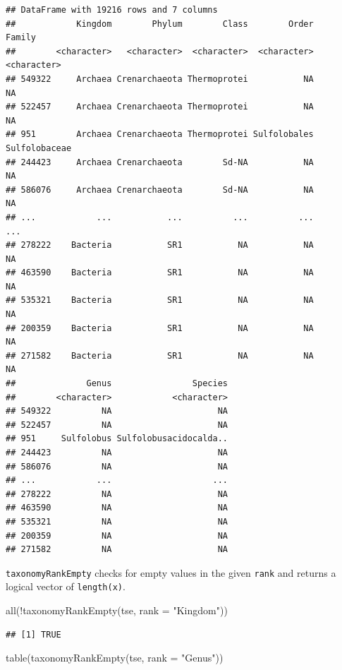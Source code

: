\documentclass[
]{book}
\newenvironment{Shaded}{\begin{snugshade}}{\end{snugshade}}
\newcommand{\AttributeTok}[1]{\textcolor[rgb]{0.77,0.63,0.00}{#1}}
\newcommand{\FunctionTok}[1]{\textcolor[rgb]{0.00,0.00,0.00}{#1}}
\newcommand{\NormalTok}[1]{#1}
\newcommand{\SpecialCharTok}[1]{\textcolor[rgb]{0.00,0.00,0.00}{#1}}
\newcommand{\StringTok}[1]{\textcolor[rgb]{0.31,0.60,0.02}{#1}}
\begin{document}
\begin{verbatim}
## DataFrame with 19216 rows and 7 columns
##            Kingdom        Phylum        Class        Order        Family
##        <character>   <character>  <character>  <character>   <character>
## 549322     Archaea Crenarchaeota Thermoprotei           NA            NA
## 522457     Archaea Crenarchaeota Thermoprotei           NA            NA
## 951        Archaea Crenarchaeota Thermoprotei Sulfolobales Sulfolobaceae
## 244423     Archaea Crenarchaeota        Sd-NA           NA            NA
## 586076     Archaea Crenarchaeota        Sd-NA           NA            NA
## ...            ...           ...          ...          ...           ...
## 278222    Bacteria           SR1           NA           NA            NA
## 463590    Bacteria           SR1           NA           NA            NA
## 535321    Bacteria           SR1           NA           NA            NA
## 200359    Bacteria           SR1           NA           NA            NA
## 271582    Bacteria           SR1           NA           NA            NA
##              Genus                Species
##        <character>            <character>
## 549322          NA                     NA
## 522457          NA                     NA
## 951     Sulfolobus Sulfolobusacidocalda..
## 244423          NA                     NA
## 586076          NA                     NA
## ...            ...                    ...
## 278222          NA                     NA
## 463590          NA                     NA
## 535321          NA                     NA
## 200359          NA                     NA
## 271582          NA                     NA
\end{verbatim}

\texttt{taxonomyRankEmpty} checks for empty values in the given \texttt{rank} and returns a
logical vector of \texttt{length(x)}.

\begin{Shaded}
\begin{Highlighting}[]
\FunctionTok{all}\NormalTok{(}\SpecialCharTok{!}\FunctionTok{taxonomyRankEmpty}\NormalTok{(tse, }\AttributeTok{rank =} \StringTok{"Kingdom"}\NormalTok{))}
\end{Highlighting}
\end{Shaded}

\begin{verbatim}
## [1] TRUE
\end{verbatim}

\begin{Shaded}
\begin{Highlighting}[]
\FunctionTok{table}\NormalTok{(}\FunctionTok{taxonomyRankEmpty}\NormalTok{(tse, }\AttributeTok{rank =} \StringTok{"Genus"}\NormalTok{))}
\end{Highlighting}
\end{Shaded}
\end{document}
